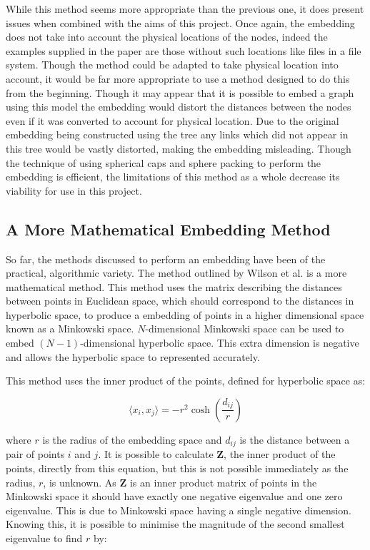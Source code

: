 While this method seems more appropriate than the previous one, it does present issues when combined with the aims of this project. Once again, the embedding does not take into account the physical locations of the nodes, indeed the examples supplied in the paper are those without such locations like files in a file system. Though the method could be adapted to take physical location into account, it would be far more appropriate to use a method designed to do this from the beginning. Though it may appear that it is possible to embed a graph using this model the embedding would distort the distances between the nodes even if it was converted to account for physical location. Due to the original embedding being constructed using the tree any links which did not appear in this tree would be vastly distorted, making the embedding misleading. Though the technique of using spherical caps and sphere packing to perform the embedding is efficient, the limitations of this method as a whole decrease its viability for use in this project.

\subsection{A More Mathematical Embedding Method}
\label{sec:hyperbolic_embedding}

So far, the methods discussed to perform an embedding have been of the practical, algorithmic variety. The method outlined by Wilson et al. \cite{wilson_spherical_2014} is a more mathematical method. This method uses the matrix describing the distances between points in Euclidean space, which should correspond to the distances in hyperbolic space, to produce a embedding of points in a higher dimensional space known as a Minkowski space. $N$-dimensional Minkowski space can be used to embed $(N-1)$-dimensional hyperbolic space. This extra dimension is negative and allows the hyperbolic space to represented accurately.

This method uses the inner product of the points, defined for hyperbolic space as: 

\begin{equation}
\label{eq:inner_product_hyperbolic}
\langle x_i,x_j\rangle = -r^2\cosh \left(\frac{d_{ij}}{r}\right)
\end{equation}

where $r$ is the radius of the embedding space and $d_{ij}$ is the distance between a pair of points $i$ and $j$. It is possible to calculate $\boldsymbol{Z}$, the inner product of the points, directly from this equation, but this is not possible immediately as the radius, $r$, is unknown. As $\boldsymbol{Z}$ is an inner product matrix of points in the Minkowski space it should have exactly one negative eigenvalue and one zero eigenvalue. This is due to Minkowski space having a single negative dimension. Knowing this, it is possible to minimise the magnitude of the second smallest eigenvalue to find $r$ by:

